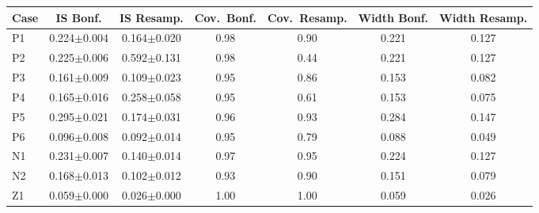 \begin{tabular}{lcccccc}
\toprule
Case & IS Bonf. & IS Resamp. & Cov.\ Bonf. & Cov.\ Resamp. & Width Bonf. & Width Resamp. \\
\midrule
P1 & 0.224$\pm$0.004 & 0.164$\pm$0.020 & 0.98 & 0.90 & 0.221 & 0.127 \\
P2 & 0.225$\pm$0.006 & 0.592$\pm$0.131 & 0.98 & 0.44 & 0.221 & 0.127 \\
P3 & 0.161$\pm$0.009 & 0.109$\pm$0.023 & 0.95 & 0.86 & 0.153 & 0.082 \\
P4 & 0.165$\pm$0.016 & 0.258$\pm$0.058 & 0.95 & 0.61 & 0.153 & 0.075 \\
P5 & 0.295$\pm$0.021 & 0.174$\pm$0.031 & 0.96 & 0.93 & 0.284 & 0.147 \\
P6 & 0.096$\pm$0.008 & 0.092$\pm$0.014 & 0.95 & 0.79 & 0.088 & 0.049 \\
N1 & 0.231$\pm$0.007 & 0.140$\pm$0.014 & 0.97 & 0.95 & 0.224 & 0.127 \\
N2 & 0.168$\pm$0.013 & 0.102$\pm$0.012 & 0.93 & 0.90 & 0.151 & 0.079 \\
Z1 & 0.059$\pm$0.000 & 0.026$\pm$0.000 & 1.00 & 1.00 & 0.059 & 0.026 \\
\bottomrule
\end{tabular}
